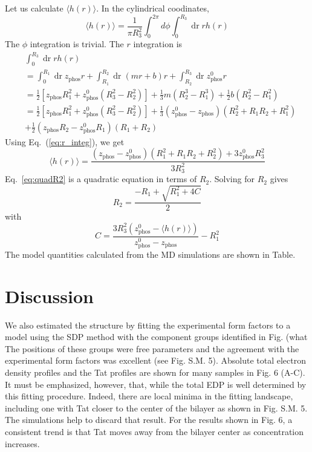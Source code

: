 \documentclass[12pt,letterpaper]{article}
\newcommand{\zphos}{z_\textrm{phos}}
\newcommand{\dr}{\mathop{dr}}
\begin{document}
Let us calculate $\langle h(r) \rangle$. In the cylindrical coodinates, 
\begin{equation}
  \langle h(r) \rangle 
  = \frac{1}{\pi R_3^2} \int_0^{2\pi}d\phi \int_0^{R_3}\dr rh(r)
\end{equation}
The $\phi$ integration is trivial. The $r$ integration is
\begin{align}
  & \int_0^{R_3}\dr rh(r) \nonumber\\
  &= \int_0^{R_1}\dr \zphos r + \int_{R_1}^{R_2}\dr (mr+b)r + \int_{R_2}^{R_3}\dr \zphos^0r \nonumber\\
  &= \frac{1}{2}\left[\zphos R_1^2+\zphos^0(R_3^2-R_2^2)\right] + 
     \frac{1}{3}m\left(R_2^3-R_1^3\right) + 
     \frac{1}{2}b\left(R_2^2-R_1^2\right) \nonumber\\        
  &= \frac{1}{2}\left[\zphos R_1^2+\zphos^0(R_3^2-R_2^2)\right] +
     \frac{1}{3}\left(\zphos^0-\zphos\right)\left(R_2^2+R_1R_2+R_1^2\right) \nonumber\\
  &  + \frac{1}{2}\left(\zphos R_2-\zphos^0 R_1\right)\left(R_1+R_2\right) \label{eq:r_integ}
\end{align}
Using Eq.~(\ref{eq:r_integ}), we get 
\begin{equation}
  \langle h(r) \rangle 
  = \frac{\left(\zphos-\zphos^0\right)\left(R_1^2+R_1R_2+R_2^2\right)+3\zphos^0R_3^2}{3R_3^2}
  \label{eq:quadR2}
\end{equation}
Eq.~\ref{eq:quadR2} is a quadratic equation in terms of $R_2$. 
Solving for $R_2$ gives
\begin{equation}
  R_2 = \frac{-R_1+\sqrt{R_1^2+4C}}{2} 
\end{equation}
with
\begin{equation}
  C = \frac{3R_3^2\left(\zphos^0-\langle h(r)\rangle\right)}{\zphos^0-\zphos} - R_1^2
\end{equation}
The model quantities calculated from the MD simulations are shown in Table.

\newpage
\section{Discussion}
We also estimated the structure by fitting the experimental form factors to a 
model using the SDP method with the component groups identified in Fig. (what  
The positions of 
these groups were free parameters and the agreement with the experimental form 
factors was excellent (see Fig. S.M. 5).  Absolute total electron density 
profiles and the Tat profiles are shown for many samples in Fig. 6 (A-C).  
It must be emphasized, however, that, while the total EDP is well determined by 
this fitting procedure.  Indeed, there are local minima in the fitting landscape, 
including one with Tat closer to the center of the bilayer as shown in Fig. 
S.M. 5.  The simulations help to discard that result. For the results shown in 
Fig. 6, a consistent trend is that Tat moves away from the bilayer center as 
concentration increases. 
\end{document}
